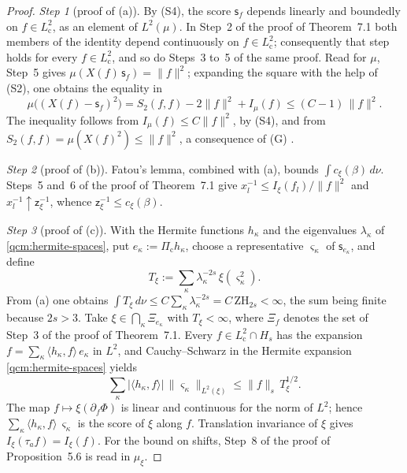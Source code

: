 \documentclass[11pt,letterpaper,reqno]{amsart}
\theoremstyle{definition}
\begin{document}
\begin{proof}
\emph{Step 1} (proof of (a)).
By (S4), the score $\mathsf s_f$ depends linearly and boundedly on $f\in L^2_{\mathrm c}$, as an element of $L^2(\mu)$.
In Step~2 of the proof of Theorem~7.1 both members of the identity depend continuously on $f\in L^2_{\mathrm c}$;
consequently that step holds for every $f\in L^2_{\mathrm c}$, and so do Steps~3 to~5 of the same proof.
Read for $\mu$, Step~5 gives $\mu(X(f)\,\mathsf s_f)=\|f\|^2$;
expanding the square with the help of (S2), one obtains the equality in
\begin{equation*}
\mu\bigl((X(f)-\mathsf s_f)^2\bigr)=S_2(f,f)-2\|f\|^2+I_\mu(f)\le(C-1)\,\|f\|^2.
\end{equation*}
The inequality follows from $I_\mu(f)\le C\|f\|^2$, by (S4), and from $S_2(f,f)=\mu(X(f)^2)\le\|f\|^2$, a consequence of (G) \cite[Proposition~5.1]{QEDConstruction}.

\emph{Step 2} (proof of (b)).
Fatou's lemma, combined with (a), bounds $\int c_\xi(\beta)\,d\nu$.
Steps~5 and~6 of the proof of Theorem~7.1 give $x_l^{-1}\le I_\xi(f_l)/\|f\|^2$ and $x_l^{-1}\uparrow\mathsf z_\xi^{-1}$, whence $\mathsf z_\xi^{-1}\le c_\xi(\beta)$.

\emph{Step 3} (proof of (c)).
With the Hermite functions $h_\kappa$ and the eigenvalues $\lambda_\kappa$ of \eqref{qcm:hermite-spaces}, put $e_\kappa:=\Pi_{\mathrm c}h_\kappa$, choose a representative $\varsigma_\kappa$ of $\mathsf s_{e_\kappa}$, and define
\begin{equation*}
T_\xi:=\sum_\kappa\lambda_\kappa^{-2s}\,\xi(\varsigma_\kappa^2).
\end{equation*}
From (a) one obtains $\int T_\xi\,\allowbreak d\nu\le C\sum_\kappa\lambda_\kappa^{-2s}=\allowbreak C\,\allowbreak \mathrm{ZH}_{2s}<\infty$, the sum being finite because $2s>3$.
Take $\xi\in\bigcap_\kappa\Xi_{e_\kappa}$ with $T_\xi<\infty$, where $\Xi_f$ denotes the set of Step~3 of the proof of Theorem~7.1.
Every $f\in L^2_{\mathrm c}\cap H_s$ has the expansion $f=\sum_\kappa\langle h_\kappa,f\rangle\,e_\kappa$ in $L^2$,
and Cauchy--Schwarz in the Hermite expansion \eqref{qcm:hermite-spaces} yields
\begin{equation*}
\sum_\kappa|\langle h_\kappa,f\rangle|\,\|\varsigma_\kappa\|_{L^2(\xi)}\le\|f\|_s\,T_\xi^{1/2}.
\end{equation*}
The map $f\mapsto\xi(\partial_f\Phi)$ is linear and continuous for the norm of $L^2$;
hence $\sum_\kappa\langle h_\kappa,f\rangle\,\varsigma_\kappa$ is the score of $\xi$ along $f$.
Translation invariance of $\xi$ gives $I_\xi(\tau_af)=I_\xi(f)$.
For the bound on shifts, Step~8 of the proof of Proposition~5.6 is read in $\mu_\xi$.


\end{proof}
\end{document}
